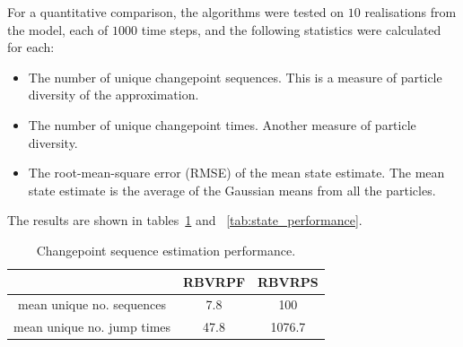 \documentclass[journal]{IEEEtran}
\begin{document}
For a quantitative comparison, the algorithms were tested on $10$ realisations from the model, each of $1000$ time steps, and the following statistics were calculated for each:
\begin{itemize}
	\item The number of unique changepoint sequences. This is a measure of particle diversity of the approximation.
	\item The number of unique changepoint times. Another measure of particle diversity.
	\item The root-mean-square error (RMSE) of the mean state estimate. The mean state estimate is the average of the Gaussian means from all the particles.
\end{itemize}



The results are shown in tables~\ref{tab:cp_performance} and ~\ref{tab:state_performance}.%

\begin{table}%
\caption{Changepoint sequence estimation performance.}
\label{tab:cp_performance}
\centering
\renewcommand{\arraystretch}{1.5}
\begin{tabular}{|c|c|c|}
\hline
 & RBVRPF & RBVRPS \\
\hline \hline
mean unique no. sequences   & 7.8      & 100       \\
\hline
mean unique no. jump times  & 47.8     & 1076.7    \\
\hline
\end{tabular}
\end{table}
\end{document}
